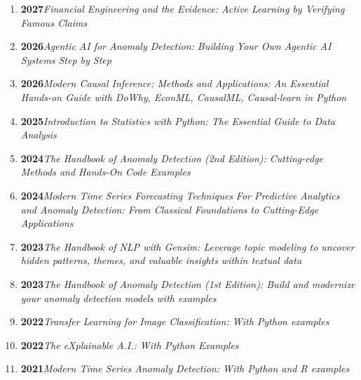 \begin{enumerate}[label=\arabic*., leftmargin=*, itemsep=1pt, topsep=4pt]
  \item \textbf{2027}\quad\textit{Financial Engineering and the Evidence: Active Learning by Verifying Famous Claims}
  \item \textbf{2026}\quad\textit{Agentic AI for Anomaly Detection: Building Your Own Agentic AI Systems Step by Step}
  \item \textbf{2026}\quad\textit{Modern Causal Inference: Methods and Applications: An Essential Hands-on Guide with DoWhy, EconML, CausalML, Causal-learn in Python}
  \item \textbf{2025}\quad\textit{Introduction to Statistics with Python: The Essential Guide to Data Analysis}
  \item \textbf{2024}\quad\textit{The Handbook of Anomaly Detection (2nd Edition): Cutting-edge Methods and Hands-On Code Examples}
  \item \textbf{2024}\quad\textit{Modern Time Series Forecasting Techniques For Predictive Analytics and Anomaly Detection: From Classical Foundations to Cutting-Edge Applications}
  \item \textbf{2023}\quad\textit{The Handbook of NLP with Gensim: Leverage topic modeling to uncover hidden patterns, themes, and valuable insights within textual data}
  \item \textbf{2023}\quad\textit{The Handbook of Anomaly Detection (1st Edition): Build and modernize your anomaly detection models with examples}
  \item \textbf{2022}\quad\textit{Transfer Learning for Image Classification: With Python examples}
  \item \textbf{2022}\quad\textit{The eXplainable A.I.: With Python Examples}
  \item \textbf{2021}\quad\textit{Modern Time Series Anomaly Detection: With Python and R examples}
\end{enumerate}





